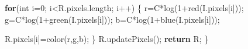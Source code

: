 \documentclass[
]{article}
\newenvironment{Shaded}{}{}
\newcommand{\ControlFlowTok}[1]{\textcolor[rgb]{0.00,0.44,0.13}{\textbf{#1}}}
\newcommand{\DataTypeTok}[1]{\textcolor[rgb]{0.56,0.13,0.00}{#1}}
\newcommand{\DecValTok}[1]{\textcolor[rgb]{0.25,0.63,0.44}{#1}}
\newcommand{\FunctionTok}[1]{\textcolor[rgb]{0.02,0.16,0.49}{#1}}
\newcommand{\NormalTok}[1]{#1}
\newcommand{\OperatorTok}[1]{\textcolor[rgb]{0.40,0.40,0.40}{#1}}
\begin{document}
\begin{Shaded}
\begin{Highlighting}[]
  \ControlFlowTok{for}\OperatorTok{(}\DataTypeTok{int}\NormalTok{ i}\OperatorTok{=}\DecValTok{0}\OperatorTok{;}\NormalTok{ i}\OperatorTok{\textless{}}\NormalTok{R}\OperatorTok{.}\FunctionTok{pixels}\OperatorTok{.}\FunctionTok{length}\OperatorTok{;}\NormalTok{ i}\OperatorTok{++)}
  \OperatorTok{\{}
\NormalTok{    r}\OperatorTok{=}\NormalTok{C}\OperatorTok{*}\FunctionTok{log}\OperatorTok{(}\DecValTok{1}\OperatorTok{+}\FunctionTok{red}\OperatorTok{(}\NormalTok{I}\OperatorTok{.}\FunctionTok{pixels}\OperatorTok{[}\NormalTok{i}\OperatorTok{]));}
\NormalTok{    g}\OperatorTok{=}\NormalTok{C}\OperatorTok{*}\FunctionTok{log}\OperatorTok{(}\DecValTok{1}\OperatorTok{+}\FunctionTok{green}\OperatorTok{(}\NormalTok{I}\OperatorTok{.}\FunctionTok{pixels}\OperatorTok{[}\NormalTok{i}\OperatorTok{]));}
\NormalTok{    b}\OperatorTok{=}\NormalTok{C}\OperatorTok{*}\FunctionTok{log}\OperatorTok{(}\DecValTok{1}\OperatorTok{+}\FunctionTok{blue}\OperatorTok{(}\NormalTok{I}\OperatorTok{.}\FunctionTok{pixels}\OperatorTok{[}\NormalTok{i}\OperatorTok{]));}
    
\NormalTok{    R}\OperatorTok{.}\FunctionTok{pixels}\OperatorTok{[}\NormalTok{i}\OperatorTok{]=}\FunctionTok{color}\OperatorTok{(}\NormalTok{r}\OperatorTok{,}\NormalTok{g}\OperatorTok{,}\NormalTok{b}\OperatorTok{);}
  \OperatorTok{\}}
\NormalTok{  R}\OperatorTok{.}\FunctionTok{updatePixels}\OperatorTok{();}
  \ControlFlowTok{return}\NormalTok{ R}\OperatorTok{;}
\OperatorTok{\}}
\end{Highlighting}
\end{Shaded}
\end{document}
